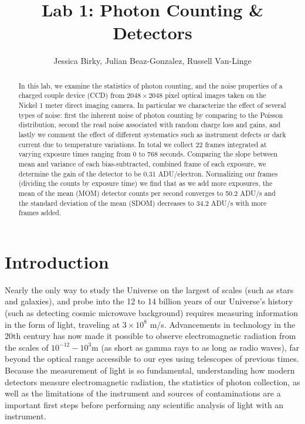 \documentclass[preprint]{aastex62}
\begin{document}
\title{\sc Lab 1: Photon Counting \& Detectors}
\author{Jessica Birky, Julian Beaz-Gonzalez, Russell Van-Linge}


\begin{abstract}
In this lab, we examine the statistics of photon counting, and the noise properties of a charged couple device (CCD) from $2048\times2048$ pixel optical images taken on the Nickel 1 meter direct imaging camera. In particular we characterize the effect of several types of noise: first the inherent noise of photon counting by comparing to the Poisson distribution, second the read noise associated with random charge loss and gains, and lastly we comment the effect of different systematics such as instrument defects or dark current due to temperature variations. In total we collect 22 frames integrated at varying exposure times ranging from 0 to 768 seconds. Comparing the slope between mean and variance of each bias-subtracted, combined frame of each exposure, we determine the gain of the detector to be 0.31 ADU/electron. Normalizing our frames (dividing the counts by exposure time) we find that as we add more exposures, the mean of the mean (MOM) detector counts per second converges to 50.2 ADU/s and the standard deviation of the mean (SDOM) decreases to 34.2 ADU/s with more frames added.

\end{abstract}
\bigskip

\section{Introduction} 
Nearly the only way to study the Universe on the largest of scales (such as stars and galaxies), and probe into the 12 to 14 billion years of our Universe's history (such as detecting cosmic microwave background) requires measuring information in the form of light, traveling at $3\times10^8$ m/s. Advancements in technology in the 20th century has now made it possible to observe electromagnetic radiation from the scales of $10^{-12}-10^3$m (as short as gamma rays to as long as radio waves), far beyond the optical range accessible to our eyes using telescopes of previous times. Because the measurement of light is so fundamental, understanding how modern detectors measure electromagnetic radiation, the statistics of photon collection, as well as the limitations of the instrument and sources of contaminations are a important first steps before performing any scientific analysis of light with an instrument.
\end{document}
